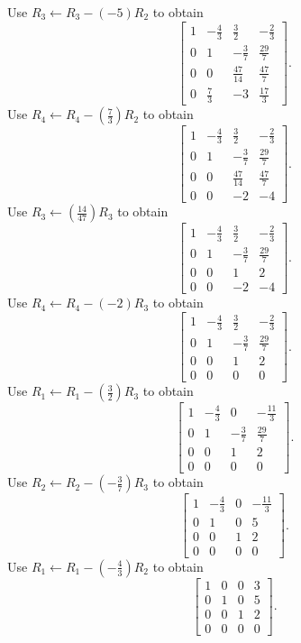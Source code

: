 Use $R_{3}\leftarrow R_{3}-(-5)R_{2}$ to obtain
\[ \left[\begin{array}{rrr|r}1&- \frac{4}{3}&\frac{3}{2}&- \frac{2}{3}\\0&1&- \frac{3}{7}&\frac{29}{7}\\0&0&\frac{47}{14}&\frac{47}{7}\\0&\frac{7}{3}&-3&\frac{17}{3}\end{array}\right].\]
Use $R_{4}\leftarrow R_{4}-(\frac{7}{3})R_{2}$ to obtain
\[ \left[\begin{array}{rrr|r}1&- \frac{4}{3}&\frac{3}{2}&- \frac{2}{3}\\0&1&- \frac{3}{7}&\frac{29}{7}\\0&0&\frac{47}{14}&\frac{47}{7}\\0&0&-2&-4\end{array}\right].\]
Use $R_{3}\leftarrow(\frac{14}{47})R_{3}$ to obtain
\[ \left[\begin{array}{rrr|r}1&- \frac{4}{3}&\frac{3}{2}&- \frac{2}{3}\\0&1&- \frac{3}{7}&\frac{29}{7}\\0&0&1&2\\0&0&-2&-4\end{array}\right].\]
Use $R_{4}\leftarrow R_{4}-(-2)R_{3}$ to obtain
\[ \left[\begin{array}{rrr|r}1&- \frac{4}{3}&\frac{3}{2}&- \frac{2}{3}\\0&1&- \frac{3}{7}&\frac{29}{7}\\0&0&1&2\\0&0&0&0\end{array}\right].\]
Use $R_{1}\leftarrow R_{1}-(\frac{3}{2})R_{3}$ to obtain
\[ \left[\begin{array}{rrr|r}1&- \frac{4}{3}&0&- \frac{11}{3}\\0&1&- \frac{3}{7}&\frac{29}{7}\\0&0&1&2\\0&0&0&0\end{array}\right].\]
Use $R_{2}\leftarrow R_{2}-(- \frac{3}{7})R_{3}$ to obtain
\[ \left[\begin{array}{rrr|r}1&- \frac{4}{3}&0&- \frac{11}{3}\\0&1&0&5\\0&0&1&2\\0&0&0&0\end{array}\right].\]
Use $R_{1}\leftarrow R_{1}-(- \frac{4}{3})R_{2}$ to obtain
\[ \left[\begin{array}{rrr|r}1&0&0&3\\0&1&0&5\\0&0&1&2\\0&0&0&0\end{array}\right].\]

